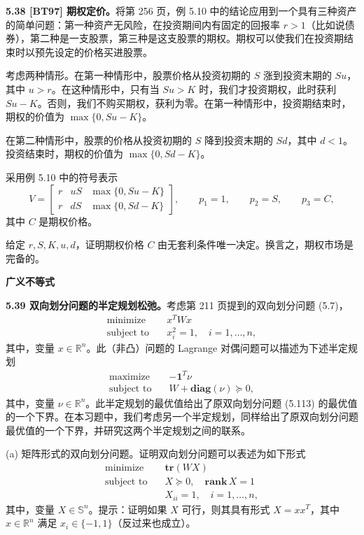 \documentclass[UTF8, 12pt, fontset=fandol, oneside]{ctexart}
\begin{document}
\noindent\textbf{5.38 [BT97] 期权定价。}\quad 将第 256 页，例 5.10 中的结论应用到一个具有三种资产的简单问题：第一种资产无风险，在投资期间内有固定的回报率 $r>1$（比如说债券），第二种是一支股票，第三种是这支股票的期权。期权可以使我们在投资期结束时以预先设定的价格买进股票。

考虑两种情形。在第一种情形中，股票价格从投资初期的 $S$ 涨到投资末期的 $Su$，其中 $u>r$。在这种情形中，只有当 $Su>K$ 时，我们才投资期权，此时获利 $Su-K$。否则，我们不购买期权，获利为零。在第一种情形中，投资期结束时，期权的价值为 $\max\{0,Su-K\}$。

在第二种情形中，股票的价格从投资初期的 $S$ 降到投资末期的 $Sd$，其中 $d<1$。投资结束时，期权的价值为 $\max\{0,Sd-K\}$。

采用例 5.10 中的符号表示
\[
V=
\begin{bmatrix}
r & uS & \max\{0,Su-K\}\\
r & dS & \max\{0,Sd-K\}
\end{bmatrix},\qquad p_1=1,\qquad p_2=S,\qquad p_3=C,
\]
其中 $C$ 是期权价格。

给定 $r,S,K,u,d$，证明期权价格 $C$ 由无套利条件唯一决定。换言之，期权市场是完备的。

\noindent\textbf{广义不等式}

\noindent\textbf{5.39 双向划分问题的半定规划松弛。}\quad 考虑第 211 页提到的双向划分问题 (5.7)，
\begin{equation}
\begin{aligned}
\text{minimize}\quad & x^TWx\\
\text{subject to}\quad & x_i^2=1,\quad i=1,\ldots,n,
\end{aligned}
\tag{5.113}
\end{equation}
其中，变量 $x\in\mathbb{R}^n$。此（非凸）问题的 Lagrange 对偶问题可以描述为下述半定规划
\begin{equation}
\begin{aligned}
\text{maximize}\quad & -\mathbf{1}^T\nu\\
\text{subject to}\quad & W+\mathbf{diag}(\nu)\succeq 0,
\end{aligned}
\tag{5.114}
\end{equation}
其中，变量 $\nu\in\mathbb{R}^n$。此半定规划的最优值给出了原双向划分问题 (5.113) 的最优值的一个下界。在本习题中，我们考虑另一个半定规划，同样给出了原双向划分问题最优值的一个下界，并研究这两个半定规划之间的联系。

(a) 矩阵形式的双向划分问题。证明双向划分问题可以表述为如下形式
\[
\begin{aligned}
\text{minimize}\quad & \mathbf{tr}(WX)\\
\text{subject to}\quad & X\succeq 0,\quad \mathbf{rank}\,X=1\\
& X_{ii}=1,\quad i=1,\ldots,n,
\end{aligned}
\]
其中，变量 $X\in\mathbb{S}^n$。提示：证明如果 $X$ 可行，则其具有形式 $X=xx^T$，其中 $x\in\mathbb{R}^n$ 满足 $x_i\in\{-1,1\}$（反过来也成立）。
\end{document}
